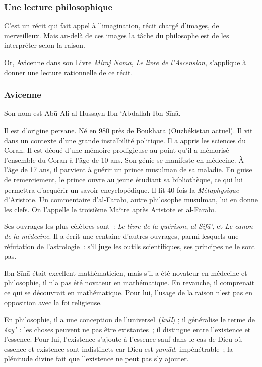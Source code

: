 \subsubsection{Une lecture
philosophique}

C'est un récit qui fait appel à l'imagination, récit chargé d'images, de
merveilleux. Mais au-delà de ces images la tâche du philosophe est de
les interpréter selon la raison.

Or, Avicenne dans son Livre \emph{Miraj Nama}, \emph{Le livre de
l'Ascension}, s'applique à donner une lecture rationnelle de ce récit.


\subsubsection{
Avicenne}

Son nom est Abū Ali al-Hussayn Ibn `Abdallah Ibn Sīnā.

Il est d'origine persane. Né en 980 près de Boukhara (Ouzbékistan
actuel). Il vit dans un contexte d'une grande instalbilité politique. Il
a appris les sciences du Coran. Il est déoué d'une mémoire prodigieuse
au point qu'il a mémorisé l'ensemble du Coran à l'âge de 10 ans. Son
génie se manifeste en médecine. À l'âge de 17 ans, il parvient à guérir
un prince musulman de sa maladie. En guise de remerciement, le prince
ouvre au jeune étudiant sa bibliothèque, ce qui lui permettra d'acquérir
un savoir encyclopédique. Il lit 40 fois la \emph{Métaphysique}
d'Aristote. Un commentaire d'al-Fārābī, autre philosophe musulman, lui
en donne les clefs. On l'appelle le troisième Maître après Aristote et
al-Fārābī.

Ses ouvrages les plus célèbres sont~: \emph{Le livre de la guérison},
\emph{al-Šifā'}, et \emph{Le canon de la médecine}. Il a écrit une
centaine d'autres ouvrages, parmi lesquels une réfutation de
l'astrologie~: s'il juge les outils scientifiques, ses principes ne le
sont pas.

Ibn Sīnā était excellent mathématicien, mais s'il a été novateur en
médecine et philosophie, il n'a pas été novateur en mathématique. En
revanche, il comprenait ce qui se découvrait en mathématique. Pour lui,
l'usage de la raison n'est pas en opposition avec la foi religieuse.

En philosophie, il a une conception de l'universel~(\emph{kull}) ; il
généralise le terme de \emph{šay'}~: les choses peuvent ne pas être
existantes~; il distingue entre l'existence et l'essence. Pour lui,
l'existence s'ajoute à l'essence sauf dans le cas de Dieu où essence et
existence sont indistincts car Dieu est \emph{ṣamād}, impénétrable~; la
plénitude divine fait que l'existence ne peut pas s'y ajouter.

